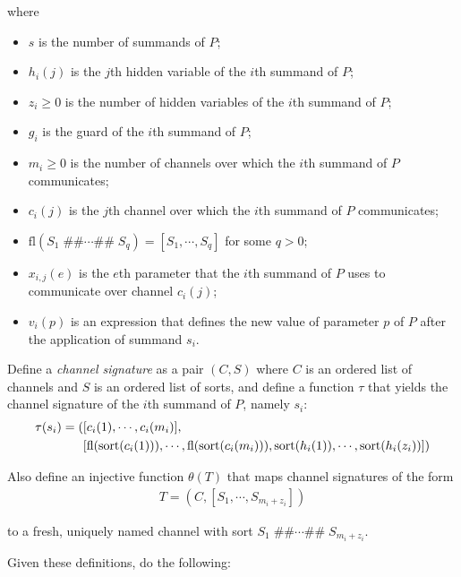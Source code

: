 \begin{itemize}
where

\begin{itemize}
\item $s$ is the number of summands of $P$;
\item $h_i(j)$ is the $j$th hidden variable of the $i$th summand of $P$;
\item $z_i \geq 0$ is the number of hidden variables of the $i$th summand of $P$;
\item $g_i$ is the guard of the $i$th summand of $P$;
\item $m_i \geq 0$ is the number of channels over which the $i$th summand of $P$ communicates;
\item $c_i(j)$ is the $j$th channel over which the $i$th summand of $P$ communicates;
\item $\text{fl}(S_1 \; \texttt{\#\#} \cdots{} \texttt{\#\#} \; S_q) = [S_1, \cdots{}, S_q]$ for some $q > 0$;
\item $x_{i,j}(e)$ is the $e$th parameter that the $i$th summand of $P$ uses to communicate over channel $c_i(j)$;
\item $v_i(p)$ is an expression that defines the new value of parameter $p$ of $P$ after the application of summand $s_i$.
\end{itemize}
\end{itemize}

Define a \emph{channel signature} as a pair $(C, S)$ where $C$ is an ordered list of channels and $S$ is an ordered list of sorts, and define a function $\tau$ that yields the channel signature of the $i$th summand of $P$, namely $s_i$:
\begin{align*}
\tau(s_i) = (&[ c_i(1), \cdots{}, c_i(m_i)], \\
&[\text{fl}(\text{sort}(c_i(1))), \cdots{}, \text{fl}(\text{sort}(c_i(m_i))), \text{sort}(h_i(1)), \cdots{}, \text{sort}(h_i(z_i))])
\end{align*}

Also define an injective function $\theta(T)$ that maps channel signatures of the form
\begin{align*}
T = (C, [S_1, \cdots{}, S_{m_i+z_i}])
\end{align*}

to a fresh, uniquely named channel with sort $S_1 \; \texttt{\#\#} \cdots{} \texttt{\#\#} \; S_{m_i+z_i}$.

Given these definitions, do the following:

